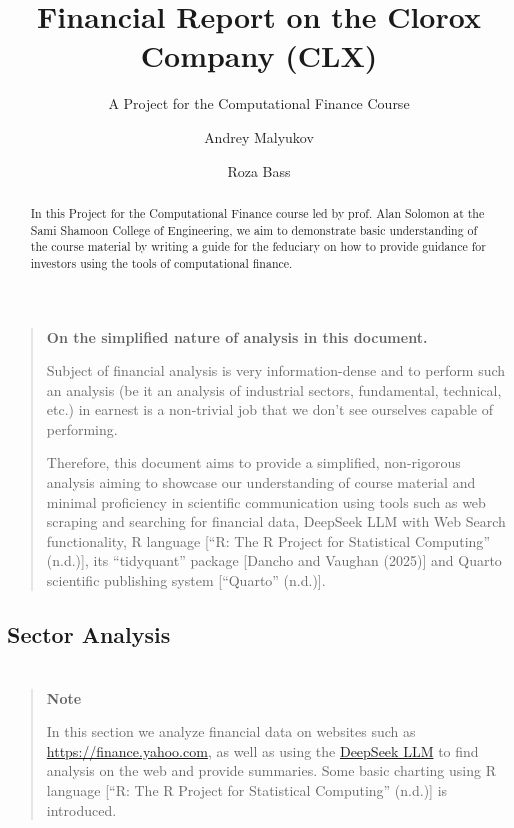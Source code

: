 \documentclass[
  letterpaper,
  DIV=11,
  numbers=noendperiod]{scrartcl}
\title{Financial Report on the Clorox Company (CLX)}
\subtitle{A Project for the Computational Finance Course}
\author{Andrey Malyukov \and Roza Bass}
\date{}
\renewcommand*\contentsname{Table of contents}
\newcommand\contentsname{Table of contents}
\begin{document}
\maketitle
\begin{abstract}
In this Project for the Computational Finance course led by prof. Alan
Solomon at the Sami Shamoon College of Engineering, we aim to
demonstrate basic understanding of the course material by writing a
guide for the feduciary on how to provide guidance for investors using
the tools of computational finance.
\end{abstract}

\renewcommand*\contentsname{Table of contents}
{
\hypersetup{linkcolor=}
\setcounter{tocdepth}{3}
\tableofcontents
}

\section{}\label{section}

\begin{quote}
\textbf{On the simplified nature of analysis in this document.}

Subject of financial analysis is very information-dense and to perform
such an analysis (be it an analysis of industrial sectors, fundamental,
technical, etc.) in earnest is a non-trivial job that we don't see
ourselves capable of performing.

Therefore, this document aims to provide a simplified, non-rigorous
analysis aiming to showcase our understanding of course material and
minimal proficiency in scientific communication using tools such as web
scraping and searching for financial data, DeepSeek LLM with Web Search
functionality, R language {[}{``R: {The R Project} for {Statistical
Computing}''} (n.d.){]}, its ``tidyquant'' package {[}Dancho and Vaughan
(2025){]} and Quarto scientific publishing system {[}{``Quarto''}
(n.d.){]}.
\end{quote}

\subsection{Sector Analysis}\label{sector-analysis}

\section{}\label{section-1}

\begin{quote}
\textbf{Note}

In this section we analyze financial data on websites such as
\url{https://finance.yahoo.com}, as well as using the
\href{https://chat.deepseek.com/}{DeepSeek LLM} to find analysis on the
web and provide summaries. Some basic charting using R language {[}{``R:
{The R Project} for {Statistical Computing}''} (n.d.){]} is introduced.
\end{quote}
\end{document}
